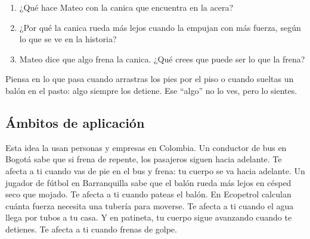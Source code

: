 \documentclass[
  spanish,
  letterpaper,
  12pt,
  oneside,
  open=any,
  DIV=15]{scrbook}
\providecommand{\tightlist}{%
  \setlength{\itemsep}{0pt}\setlength{\parskip}{0pt}}
\begin{document}
\begin{tcolorbox}[enhanced jigsaw, arc=.35mm, bottomrule=.15mm, bottomtitle=1mm, breakable, colback=white, colbacktitle=quarto-callout-note-color!10!white, colframe=quarto-callout-note-color-frame, coltitle=black, left=2mm, leftrule=.75mm, opacityback=0, opacitybacktitle=0.6, rightrule=.15mm, title=\textcolor{quarto-callout-note-color}{\faInfo}\hspace{0.5em}{Reflexiona y Conecta (Preguntas de Comprensión)}, titlerule=0mm, toprule=.15mm, toptitle=1mm]

\begin{enumerate}
\def\labelenumi{\arabic{enumi}.}
\tightlist
\item
  ¿Qué hace Mateo con la canica que encuentra en la acera?
\item
  ¿Por qué la canica rueda más lejos cuando la empujan con más fuerza,
  según lo que se ve en la historia?
\item
  Mateo dice que algo frena la canica. ¿Qué crees que puede ser lo que
  la frena?
\end{enumerate}

\end{tcolorbox}

\begin{tcolorbox}[enhanced jigsaw, arc=.35mm, bottomrule=.15mm, bottomtitle=1mm, breakable, colback=white, colbacktitle=quarto-callout-tip-color!10!white, colframe=quarto-callout-tip-color-frame, coltitle=black, left=2mm, leftrule=.75mm, opacityback=0, opacitybacktitle=0.6, rightrule=.15mm, title=\textcolor{quarto-callout-tip-color}{\faLightbulb}\hspace{0.5em}{Apoyo Procedimental (Pista)}, titlerule=0mm, toprule=.15mm, toptitle=1mm]

Piensa en lo que pasa cuando arrastras los pies por el piso o cuando
sueltas un balón en el pasto: algo siempre los detiene. Ese ``algo'' no
lo ves, pero lo sientes.

\end{tcolorbox}

\subsection{Ámbitos de aplicación}\label{uxe1mbitos-de-aplicaciuxf3n}

Esta idea la usan personas y empresas en Colombia. Un conductor de bus
en Bogotá sabe que si frena de repente, los pasajeros siguen hacia
adelante. Te afecta a ti cuando vas de pie en el bus y frena: tu cuerpo
se va hacia adelante. Un jugador de fútbol en Barranquilla sabe que el
balón rueda más lejos en césped seco que mojado. Te afecta a ti cuando
pateas el balón. En Ecopetrol calculan cuánta fuerza necesita una
tubería para moverse. Te afecta a ti cuando el agua llega por tubos a tu
casa. Y en patineta, tu cuerpo sigue avanzando cuando te detienes. Te
afecta a ti cuando frenas de golpe.
\end{document}

